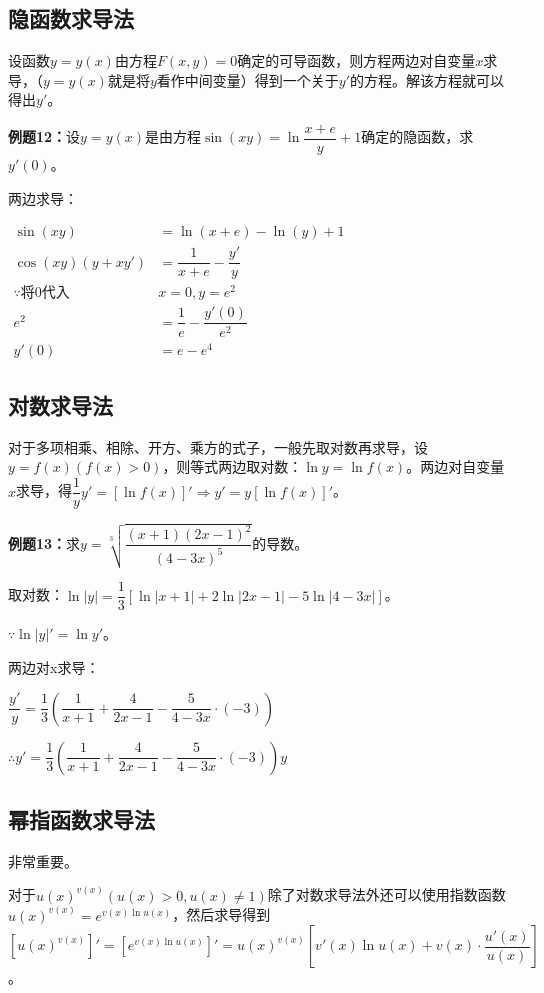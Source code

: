 \documentclass[UTF8, 12pt]{ctexart}
\begin{document}
\subsection{隐函数求导法}

设函数$y=y(x)$由方程$F(x,y)=0$确定的可导函数，则方程两边对自变量$x$求导，（$y=y(x)$就是将$y$看作中间变量）得到一个关于$y'$的方程。解该方程就可以得出$y'$。

\textbf{例题12：}设$y=y(x)$是由方程$\sin(xy)=\ln\dfrac{x+e}{y}+1$确定的隐函数，求$y'(0)$。

两边求导：

$
\begin{aligned}
    \sin(xy) &=\ln(x+e)-\ln(y)+1 \\
    \cos(xy)(y+xy') &=\dfrac{1}{x+e}-\dfrac{y'}{y} \\
    \because\text{将0代入} & x=0, y=e^2 \\
    e^2&=\dfrac{1}{e}-\dfrac{y'(0)}{e^2} \\
    y'(0) & =e-e^4
\end{aligned}
$

\subsection{对数求导法}

对于多项相乘、相除、开方、乘方的式子，一般先取对数再求导，设$y=f(x)(f(x)>0)$，则等式两边取对数：$\ln y=\ln f(x)$。两边对自变量$x$求导，得$\dfrac{1}{y}y'=[\ln f(x)]'\Rightarrow y'=y[\ln f(x)]'$。

\textbf{例题13：}求$y=\sqrt[3]{\dfrac{(x+1)(2x-1)^2}{(4-3x)^5}}$的导数。

取对数：$\ln\vert y\vert=\dfrac{1}{3}[\ln\vert x+1\vert+2\ln\vert 2x-1\vert-5\ln\vert 4-3x\vert]$。

$\because \ln\vert y\vert'=\ln y'$。

两边对x求导：

$\dfrac{y'}{y}=\dfrac{1}{3}\left(\dfrac{1}{x+1}+\dfrac{4}{2x-1}-\dfrac{5}{4-3x}\cdot(-3)\right)$

$\therefore y'=\dfrac{1}{3}\left(\dfrac{1}{x+1}+\dfrac{4}{2x-1}-\dfrac{5}{4-3x}\cdot(-3)\right)y$

\subsection{幂指函数求导法}

非常重要。

对于$u(x)^{v(x)}(u(x)>0,u(x)\neq 1)$除了对数求导法外还可以使用指数函数$u(x)^{v(x)}=e^{v(x)\ln u(x)}$，然后求导得到$[u(x)^{v(x)}]'=[e^{v(x)\ln u(x)}]'=u(x)^{v(x)}\left[v'(x)\ln u(x)+v(x)\cdot\dfrac{u'(x)}{u(x)}\right]$。
\end{document}
